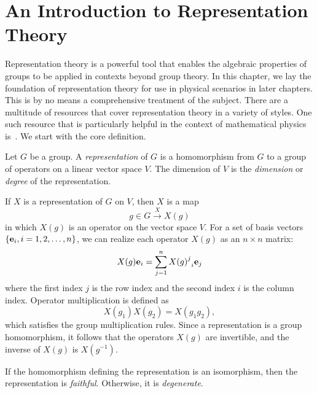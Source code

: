 \chapter{An Introduction to Representation Theory}\label{ch:rep_background}

Representation theory is a powerful tool that enables the algebraic properties of groups to be applied in contexts beyond group theory. In this chapter, we lay the foundation of representation theory for use in physical scenarios in later chapters. This is by no means a comprehensive treatment of the subject. There are a multitude of resources that cover representation theory in a variety of styles. One such resource that is particularly helpful in the context of mathematical physics is~\cite{Tung1985}. We start with the core definition.
\begin{definition}
    Let $G$ be a group. A \textit{representation} of $G$ is a homomorphism from $G$ to a group of operators on a linear vector space $V$. The dimension of $V$ is the \textit{dimension} or \textit{degree} of the representation.
\end{definition}

If $X$ is a representation of $G$ on $V$, then $X$ is a map
\begin{equation}
    g\in G\xrightarrow{X} X(g)
\end{equation}
in which $X(g)$ is an operator on the vector space $V$. For a set of basis vectors $\{\mathbf{e}_i,i=1,2,\dots,n\}$, we can realize each operator $X(g)$ as an $n\times n$ matrix:
\begin{equation}
    X(g)\e_i = \sum_{j=1}^n {{X(g)}^j}_i\e_j %
\end{equation}
where the first index $j$ is the row index and the second index $i$ is the column index. Operator multiplication is defined as
\begin{equation}
    X(g_1)X(g_2) = X(g_1g_2),
\end{equation}
which satisfies the group multiplication rules. Since a representation is a group homomorphism, it follows that the operators $X(g)$ are invertible, and the inverse of $X(g)$ is $X(g^{-1})$.

\begin{definition}
    If the homomorphism defining the representation is an isomorphism, then the representation is \textit{faithful}. Otherwise, it is \textit{degenerate}.
\end{definition}

